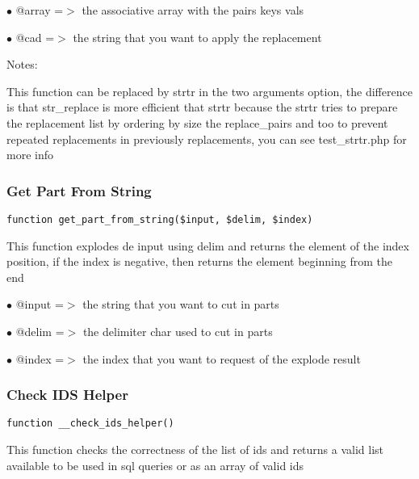 \documentclass[a4paper]{article}
\begin{document}
\begin{compactitem}
\item[\color{myblue}$\bullet$] @array =$>$ the associative array with the pairs keys vals
\item[\color{myblue}$\bullet$] @cad   =$>$ the string that you want to apply the replacement
\end{compactitem}

Notes:

This function can be replaced by strtr in the two arguments option, the
difference is that str\_replace is more efficient that strtr because the
strtr tries to prepare the replacement list by ordering by size the
replace\_pairs and too to prevent repeated replacements in previously
replacements, you can see test\_strtr.php for more info

\hypertarget{toc248}{}
\subsubsection{Get Part From String}

\begin{lstlisting}
function get_part_from_string($input, $delim, $index)
\end{lstlisting}

This function explodes de input using delim and returns the element of the
index position, if the index is negative, then returns the element beginning
from the end

\begin{compactitem}
\item[\color{myblue}$\bullet$] @input =$>$ the string that you want to cut in parts
\item[\color{myblue}$\bullet$] @delim =$>$ the delimiter char used to cut in parts
\item[\color{myblue}$\bullet$] @index =$>$ the index that you want to request of the explode result
\end{compactitem}

\hypertarget{toc249}{}
\subsubsection{Check IDS Helper}

\begin{lstlisting}
function __check_ids_helper()
\end{lstlisting}

This function checks the correctness of the list of ids and returns a valid
list available to be used in sql queries or as an array of valid ids
\end{document}

